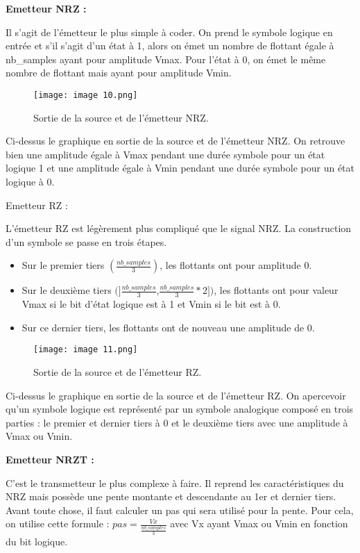 \textbf{Emetteur NRZ :}

Il s’agit de l’émetteur le plus simple à coder. On prend le symbole logique en entrée et s’il s’agit d’un état à 1, alors on émet un nombre de flottant égale à nb\_samples ayant pour amplitude Vmax. Pour l’état à 0, on émet le même nombre de flottant mais ayant pour amplitude Vmin.

\begin{figure}[h]
    \centering
    \texttt{[image: image 10.png]}
    \caption{\label{fig:image10}Sortie de la source et de l'émetteur NRZ.}
\end{figure}

Ci-dessus le graphique en sortie de la source et de l’émetteur NRZ. On retrouve bien une amplitude égale à Vmax pendant une durée symbole pour un état logique 1 et une amplitude égale à Vmin pendant une durée symbole pour un état logique à 0.

Emetteur RZ :

L’émetteur RZ est légèrement plus compliqué que le signal NRZ. La construction d’un symbole se passe en trois étapes.

\begin{itemize}
    \item Sur le premier tiers $(\frac{nb\_samples}{3})$, les flottants ont pour amplitude 0.
    \item Sur le deuxième tiers $(]\frac{nb\_samples}{3}$,$\frac{nb\_samples}{3}*2])$, les flottants ont pour valeur Vmax si le bit d'état logique est à 1 et Vmin si le bit est à 0.
    \item Sur ce dernier tiers, les flottants ont de nouveau une amplitude de 0.
\end{itemize}

\begin{figure}[h]
    \centering
    \texttt{[image: image 11.png]}
    \caption{\label{fig:image11}Sortie de la source et de l'émetteur RZ.}
\end{figure}

Ci-dessus le graphique en sortie de la source et de l’émetteur RZ. On apercevoir qu’un symbole logique est représenté par un symbole analogique composé en trois parties : le premier et dernier tiers à 0 et le deuxième tiers avec une amplitude à Vmax ou Vmin.

\textbf{Emetteur NRZT :}

C’est le transmetteur le plus complexe à faire. Il reprend les caractéristiques du NRZ mais possède une pente montante et descendante au 1er et dernier tiers. Avant toute chose, il faut calculer un pas qui sera utilisé pour la pente. Pour cela, on utilise cette formule : $ pas = \frac{Vx}{\frac{nb\_samples}{3}} $ avec Vx ayant Vmax ou Vmin en fonction du bit logique.

